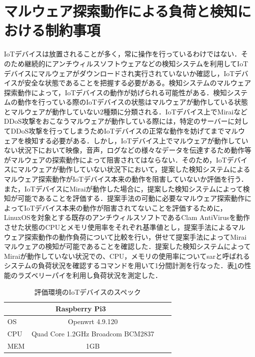 \section{マルウェア探索動作による負荷と検知における制約事項}
IoTデバイスは放置されることが多く，常に操作を行っているわけではない．そのため継続的にアンチウィルスソフトウェアなどの検知システムを利用してIoTデバイスにマルウェアがダウンロードされ実行されていないか確認し，IoTデバイスが安全な状態であることを把握する必要がある。検知システムのマルウェア探索動作によって，IoTデバイスの動作が妨げられる可能性がある．検知システムの動作を行っている際のIoTデバイスの状態はマルウェアが動作している状態とマルウェアが動作していない2種類に分類される．IoTデバイス上でMiraiなどDDoS攻撃をおこなうマルウェアが動作している際には，特定のサーバーに対してDDoS攻撃を行ってしまうためIoTデバイスの正常な動作を妨げてまでマルウェアを検知する必要がある．しかし，IoTデバイス上でマルウェアが動作していない状況下において映像，音声，ログなどの様々なデータを伝達するため動作等がマルウェアの探索動作によって阻害されてはならない．そのため，IoTデバイスにマルウェアが動作していない状況下において，提案した検知システムによるマルウェア探索動作がIoTデバイス本来の動作を阻害していないか評価を行う．また，IoTデバイスにMiraiが動作した場合に，提案した検知システムによって検知が可能であることを評価する．提案手法の可動に必要なマルウェア探索動作によってIoTデバイス本来の動作が阻害されてないことを評価するために，LinuxOSを対象とする既存のアンチウィルスソフトであるClam AntiVirusを動作させた状態のCPUとメモリ使用率をそれぞれ基準値とし，提案手法によるマルウェア探索動作の動作負荷について比較を行い，併せて提案手法によってMiraiマルウェアの検知が可能であることを確認した．提案した検知システムによってMiraiが動作していない状況での、CPU，メモリの使用率についてsarと呼ばれるシステムの負荷状況を確認するコマンドを用いて1分間計測を行なった．表\ref{tab:spec}の性能のラズベリーパイを利用し負荷状況を測定した．
\begin{table}[h]
   \caption{評価環境のIoTデバイスのスペック}
   \label{tab:spec}
   \centering
   \begin{tabular}{|l|c|l|l|l|}
   \hline
   \multicolumn{3}{|c|}{Raspberry Pi3} \\ \hline
   OS     & \multicolumn{2}{c|}{Openwrt 4.9.120}                   \\ \hline
   CPU    & \multicolumn{2}{c|}{Quad Core 1.2GHz Broadcom BCM2837} \\ \hline
   MEM    & \multicolumn{2}{c|}{1GB}                               \\ \hline
   \end{tabular}
\end{table}

